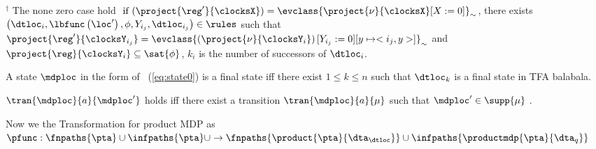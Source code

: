 \begin{definition}
${}^\dag$ The none zero case hold
$
    \mbox{ if } (
        \project
            {\reg'}
            {\clocksX}) 
        = 
        \evclass{
            \project
                {\nu}
                {\clocksX}
            [X := 0 ]
        }_\sim 
$, there exists
$
    \left (
        \dtloc_i,
        \lbfunc\left(\loc'\right),
        \phi,
        Y_{i_j},
        \dtloc_{i_j}
    \right) \in \rules
$ 
such that \\
$
    \project
        {\reg'}
        {\clocksY_{i_j}}
    = 
        \evclass{ \left (
                \project
                    {\nu} 
                    {\clocksY_{i}}
            \right) 
            [ Y_{i_j} := 0 ] 
            [ y \mapsto <i_j,y> ]
        }_\sim 
$ 
and 
$    
    \project
        {\reg}
        {\clocksY_{i}}
    \subseteq \sat{\phi}
$,
{\color{red} $ k_i $ is the number of successors of $ \dtloc_i $}. 

\end{definition}

\begin{definition}
A state $\mdploc$ in the form of ~(\ref{eq:state0}) is a final state iff there exist 
$ 1 \le k \le n $ such that $\dtloc_k$ is a final state in TFA balabala.
\end{definition}
$
    \tran
        {\mdploc}
        {a}
        {\mdploc'}
$
holds iff there exist a transition
$
    \tran
        {\mdploc}
        {a}
        {\mu}
$
such that
$ \mdploc' \in \supp{\mu}$ .

Now we the Transformation for product MDP as
$
\pfunc :
    \fnpaths{\pta}
    \cup
    \infpaths{\pta}
    \cup
\rightarrow 
    \fnpaths{\product{\pta}{\dta_\dtloc}}
    \cup
    \infpaths{\productmdp{\pta}{\dta_q}}
$

